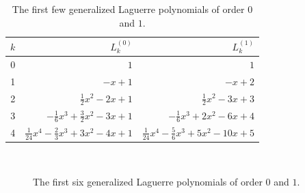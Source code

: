 \begin{table}
\centering
\def\arraystretch{1.4}
\begin{tabular}{c@{\qquad}r@{\qquad}r}
$k$ & $L_k^{(0)}$ & $L_k^{(1)}$ \\
\hline 0 & $1$ & $1$ \\
\hline 1 & $-x+1$ & $-x+2$ \\
\hline 2 & $\frac{1}{2}x^2 - 2x + 1$ & $\frac{1}{2}x^2 - 3x + 3$ \\
\hline 3 & $-\frac{1}{6}x^3 + \frac{3}{2}x^2 - 3x + 1$ & $-\frac{1}{6}x^3 + 2x^2 - 6x + 4$ \\
\hline 4 & $\frac{1}{24}x^4-\frac{2}{3}x^3+3x^2-4x+1$ & $\frac{1}{24}x^4-\frac{5}{6}x^3+5x^2-10x+5$ \\
\end{tabular}
\caption{The first few generalized Laguerre polynomials of order $0$ and $1$.} \label{tbl:laguerre}
\end{table}

\begin{figure}
\centering
{} \\
\caption{The first six generalized Laguerre polynomials of order $0$ and $1$.}
\label{fig:laguerre}
\end{figure}

